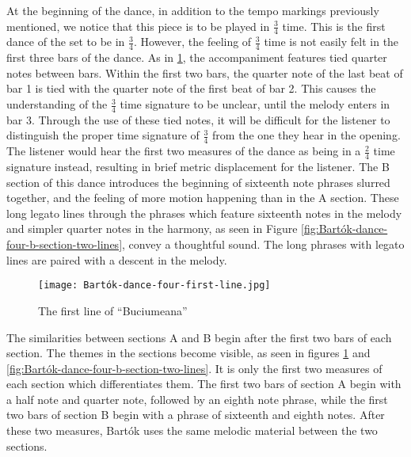 At the beginning of the dance, in addition to the tempo markings previously mentioned, we notice that this piece is to be played in $\frac{3}{4}$ time. This is the first dance of the set to be in $\frac{3}{4}$. However, the feeling of $\frac{3}{4}$ time is not easily felt in the first three bars of the dance. As in \ref{fig:Bartók-dance-four-first-line}\autocite{Lung_2016}, the accompaniment features tied quarter notes between bars. Within the first two bars, the quarter note of the last beat of bar 1 is tied with the quarter note of the first beat of bar 2. This causes the understanding of the $\frac{3}{4}$ time signature to be unclear, until the melody enters in bar 3. Through the use of these tied notes, it will be difficult for the listener to distinguish the proper time signature of $\frac{3}{4}$ from the one they hear in the opening. The listener would hear the first two measures of the dance as being in a $\frac{2}{4}$ time signature instead, resulting in brief metric displacement for the listener. The B section of this dance introduces the beginning of sixteenth note phrases slurred together, and the feeling of more motion happening than in the A section. These long legato lines through the phrases which feature sixteenth notes in the melody and simpler quarter notes in the harmony, as seen in Figure \ref{fig:Bartók-dance-four-b-section-two-lines}\autocite{Lung_2016}, convey a thoughtful sound. The long phrases with legato lines are paired with a descent in the melody. 

\begin{figure}[h]
  \centering
  \texttt{[image: Bartók-dance-four-first-line.jpg]}
  \caption[The first line of ``Buciumeana'' of Bartók's \textit{Romanian Folk Dances}, Sz. 56, BB 68]{The first line of ``Buciumeana''}
  \label{fig:Bartók-dance-four-first-line}
\end{figure}


The similarities between sections A and B begin after the first two bars of each section. The themes in the sections become visible, as seen in figures \ref{fig:Bartók-dance-four-first-line}\autocite{Lung_2016} and \ref{fig:Bartók-dance-four-b-section-two-lines}\autocite{Lung_2016}. It is only the first two measures of each section which differentiates them. The first two bars of section A begin with a half note and quarter note, followed by an eighth note phrase, while the first two bars of section B begin with a phrase of sixteenth and eighth notes. After these two measures, Bartók uses the same melodic material between the two sections. 

